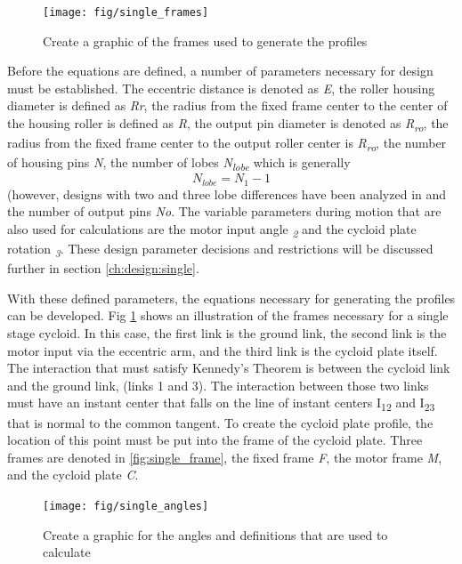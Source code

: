 \begin{figure}[!b]
   \centering
   \texttt{[image: fig/single\_frames]}
   \caption{Create a graphic of the frames used to generate the profiles}
   \label{fig:single_frames}
\end{figure}

Before the equations are defined, a number of parameters necessary for design must be established. The eccentric distance is denoted as \textit{E}, the roller housing diameter is defined as \textit{Rr}, the radius from the fixed frame center to the center of the housing roller is defined as \textit{R}, the output pin diameter is denoted as \textit{R\textsubscript{ro}}, the radius from the fixed frame center to the output roller center is \textit{R\textsubscript{ro}}, the number of housing pins \textit{N}, the number of lobes \textit{N\textsubscript{lobe}} which is generally 
\begin{equation}
N_{lobe} = N_1 - 1
\end{equation}
(however, designs with two and three lobe differences have been analyzed in \cite{ref:hsieh_traditional} and the number of output pins \textit{No}. The variable parameters during motion that are also used for calculations are the motor input angle \textit{\textphi\textsubscript{2}} and the cycloid plate rotation \textit{\textphi\textsubscript{3}}. These design parameter decisions and restrictions will be discussed further in section \ref{ch:design:single}. 

With these defined parameters, the equations necessary for generating the profiles can be developed.
Fig \ref{fig:single_frames} shows an illustration of the frames necessary for a single stage cycloid. In this case, the first link is the ground link, the second link is the motor input via the eccentric arm, and the third link is the cycloid plate itself. The interaction that must satisfy Kennedy's Theorem is between the cycloid link and the ground link, (links 1 and 3). The interaction between those two links must have an instant center that falls on the line of instant centers I\textsubscript{12} and I\textsubscript{23} that is normal to the common tangent. To create the cycloid plate profile, the location of this point must be put into the frame of the cycloid plate. Three frames are denoted in \ref{fig:single_frame}, the fixed frame \textit{F}, the motor frame \textit{M}, and the cycloid plate \textit{C}. 

\begin{figure}[!b]
   \centering
   \texttt{[image: fig/single\_angles]}
   \caption{Create a graphic for the angles and definitions that are used to calculate}
   \label{fig:single_angles}
\end{figure}

